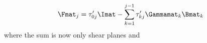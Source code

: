 \begin{equation}
  \Fmat_j = \tau'_{0 j} \Imat - \sum\limits_{k = 1}^{j -1}\tau'_{k j} \Gammamat_k \Bmat_k
\end{equation}
where the sum is now only shear planes and